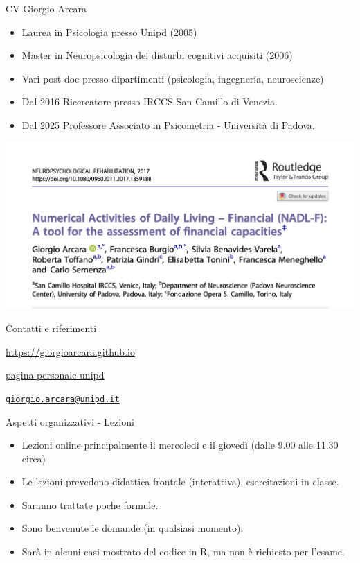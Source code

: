 \documentclass[
  ignorenonframetext,
]{beamer}
\providecommand{\tightlist}{%
  \setlength{\itemsep}{0pt}\setlength{\parskip}{0pt}}
\begin{document}
\begin{frame}{CV Giorgio Arcara}
\label{cv-giorgio-arcara}
\footnotesize

\begin{itemize}
\item
  Laurea in Psicologia presso Unipd (2005)
\item
  Master in Neuropsicologia dei disturbi cognitivi acquisiti (2006)
\item
  Vari post-doc presso dipartimenti (psicologia, ingegneria,
  neuroscienze)
\item
  Dal 2016 Ricercatore presso IRCCS San Camillo di Venezia.
\item
  Dal 2025 Professore Associato in Psicometria - Università di Padova.
\end{itemize}

\pause

\hfill
\includegraphics[width=0.6\linewidth,height=\textheight,keepaspectratio]{Figures/NADL_F.png}
\end{frame}

\begin{frame}{Contatti e riferimenti}
\label{contatti-e-riferimenti}
\centering

\href{https://giorgioarcara.github.io}{\ul{https://giorgioarcara.github.io}}

\href{https://www.dpg.unipd.it/category/ruoli/personale-docente?key=4D0707A2DD6FCCD50B90E4C9F316A625}{\ul{pagina
personale unipd}}

\href{mailto:giorgio.arcara@unipd.it}{\nolinkurl{giorgio.arcara@unipd.it}}
\end{frame}

\begin{frame}{Aspetti organizzativi - Lezioni}
\label{aspetti-organizzativi---lezioni}
\begin{itemize}
\tightlist
\item
  Lezioni online principalmente il mercoledì e il giovedì (dalle 9.00
  alle 11.30 circa)
\item
  Le lezioni prevedono didattica frontale (interattiva), esercitazioni
  in classe.
\item
  Saranno trattate poche formule.
\item
  Sono benvenute le domande (in qualsiasi momento).
\item
  Sarà in alcuni casi mostrato del codice in R, ma non è richiesto per
  l'esame.
\end{itemize}
\end{frame}
\end{document}
